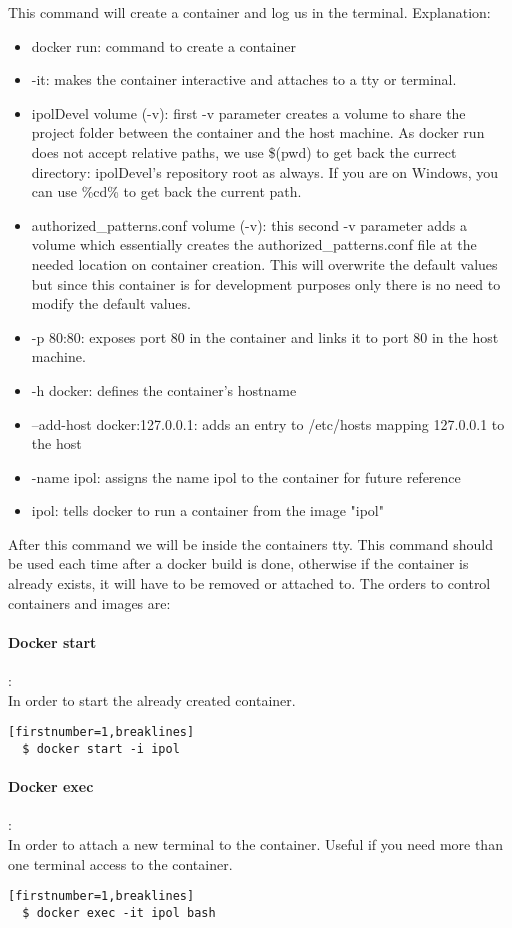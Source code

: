 \documentclass[a4paper,12pt]{article}
\begin{document}
This command will create a container and log us in the terminal. Explanation:
\begin{itemize}
  \item docker run: command to create a container
  \item -it: makes the container interactive and attaches to a tty or terminal.
  \item ipolDevel volume (-v): first -v parameter creates a volume to share the project folder between the container and the host machine.
  As docker run does not accept relative paths, we use \$(pwd) to get back the currect directory: ipolDevel's repository root as always. If you are on
  Windows, you can use \%cd\% to get back the current path. 
  \item authorized\_patterns.conf volume (-v): this second -v parameter adds a volume which essentially creates the authorized\_patterns.conf file at the 
  needed location on container creation. 
  This will overwrite the default values but since this container is for development purposes only there is no need to modify the default values.
  \item -p 80:80: exposes port 80 in the container and links it to port 80 in the host machine.
  \item -h docker: defines the container's hostname
  \item --add-host docker:127.0.0.1: adds an entry to /etc/hosts mapping 127.0.0.1 to the host
  \item -name ipol: assigns the name ipol to the container for future reference
  \item ipol: tells docker to run a container from the image "ipol"
\end{itemize}

After this command we will be inside the containers tty. This command should be used each time after a docker build is done,
otherwise if the container is already exists, it will have to be removed or attached to. The orders to control containers and images are:

\paragraph{Docker start}:\\
In order to start the already created container.
\begin{verbatim}[firstnumber=1,breaklines]
  $ docker start -i ipol
\end{verbatim}

\paragraph{Docker exec}:\\
In order to attach a new terminal to the container. Useful if you need more than one terminal access to the container.
\begin{verbatim}[firstnumber=1,breaklines]
  $ docker exec -it ipol bash
\end{verbatim}
\end{document}
